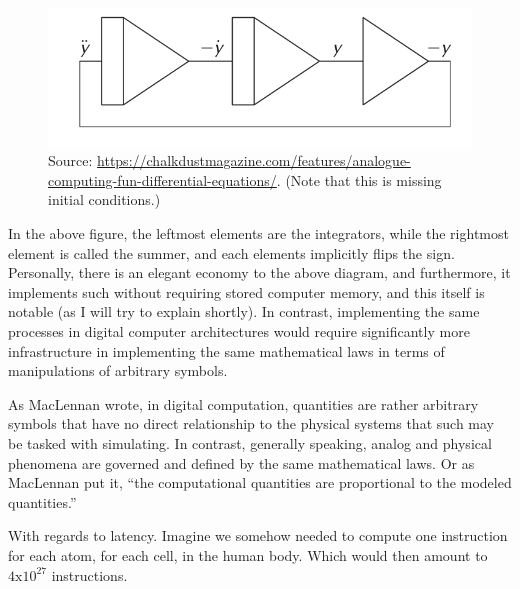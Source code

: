 \begin{figure}[H]
    \centering
    \includegraphics[width=0.6\linewidth]{../assets/analogue-computing-fun-differential-equations.png}
    \caption{Source: \url{https://chalkdustmagazine.com/features/analogue-computing-fun-differential-equations/}. (Note that this is missing initial conditions.)}
    \label{Image Label}
\end{figure}

In the above figure, the leftmost elements are the integrators, while the rightmost element is called the summer, and each elements implicitly flips the sign. Personally, there is an elegant economy to the above diagram, and furthermore, it implements such without requiring stored computer memory, and this itself is notable (as I will try to explain shortly). In contrast, implementing the same processes in digital computer architectures would require significantly more infrastructure in implementing the same mathematical laws in terms of manipulations of arbitrary symbols.

As MacLennan wrote, in digital computation, quantities are rather arbitrary symbols that have no direct relationship to the physical systems that such may be tasked with simulating. In contrast, generally speaking, analog and physical phenomena are governed and defined by the same mathematical laws. Or as MacLennan put it, ``the computational quantities are proportional to the modeled quantities.''

With regards to latency. Imagine we somehow needed to compute one instruction for each atom, for each cell, in the human body. Which would then amount to $4 \mathrm{x} 10^{27}$ instructions.


